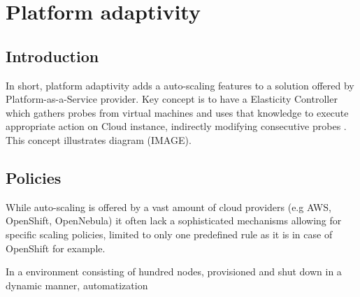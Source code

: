 \chapter{Platform adaptivity}


\section{Introduction}
In short, platform adaptivity adds a auto-scaling features to a solution offered by Platform-as-a-Service provider. Key concept is to have a Elasticity Controller which gathers probes from virtual machines and uses that knowledge to execute appropriate action on Cloud instance, indirectly modifying consecutive probes \cite{VaRoBu11}. This concept illustrates diagram (IMAGE).

\section{Policies}
While auto-scaling is offered by a vast amount of cloud providers (e.g AWS, OpenShift, OpenNebula) it often lack a sophisticated mechanisms allowing for specific scaling policies, limited to only one predefined rule as it is in case of OpenShift for example. 

In a environment consisting of hundred nodes, provisioned and shut down in a dynamic manner, automatization 

